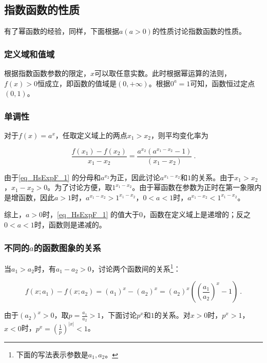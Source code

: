 \subsection{指数函数的性质}\label{sub_HsExpF_1}

有了幂函数的经验，同样，下面根据$a(a>0)$的性质讨论指数函数的性质。

\subsubsection{定义域和值域}

根据指数函数参数的限定，$x$可以取任意实数。此时根据幂运算的法则，$f(x)>0$恒成立，即函数的值域是$(0,+\infty)$。根据$0^a=1$可知，函数恒过定点$(0,1)$。

\subsubsection{单调性}

对于$f(x)=a^x$，任取定义域上的两点$x_1>x_2$，则平均变化率为

\begin{equation}\label{eq_HsExpF_1}
\frac{f(x_1)-f(x_2)}{x_1-x_2}=\frac{a^{x_2}(a^{x_1-x_2}-1)}{(x_1-x_2)}~.
\end{equation}

由于\autoref{eq_HsExpF_1} 的分母和$a^{x_2}$为正，因此讨论$a^{x_1-x_2}$和$1$的关系。由于$x_1>x_2$，$x_1-x_2>0$。为了讨论方便，取$1^{x_1-x_2}$。由于幂函数在参数为正时在第一象限内是增函数，因此$a>1$时，$a^{x_1-x_2}>1^{x_1-x_2}$，$0<a<1$时，$a^{x_1-x_2}<1^{x_1-x_2}$。

综上，$a>0$时，\autoref{eq_HsExpF_1} 的值大于$0$，函数在定义域上是递增的；反之$0<a<1$时，函数则是递减的。

\subsubsection{不同的$a$的函数图象的关系}

当$a_1>a_2$时，有$a_1-a_2>0$，讨论两个函数间的关系\footnote{下面的写法表示参数是$a_1,a_2$。}：

\begin{equation}
f(x;a_1)-f(x;a_2)=(a_1)^x-(a_2)^x=(a_2)^x\left(\left(\frac{a_1}{a_2}\right)^x-1\right)~.
\end{equation}

由于$\displaystyle (a_2)^x>0$，取$p=\frac{a_1}{a_2}>1$，下面讨论$p^x$和$1$的关系。对$x>0$时，$p^x>1$，$x<0$时，$\displaystyle p^x=\left(\frac{1}{p}\right)^{|x|}<1$。

